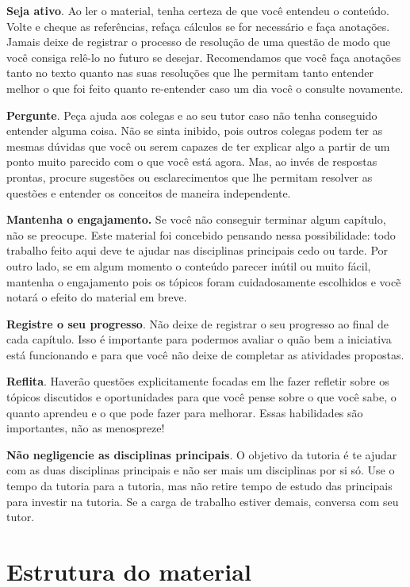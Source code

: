 \documentclass[10pt,openany]{book}
\begin{document}
\textbf{Seja ativo}. Ao ler o material, tenha certeza de que você entendeu o conteúdo. Volte e cheque as referências, refaça cálculos se for necessário e faça anotações. Jamais deixe de registrar o processo de resolução de uma questão de modo que você consiga relê-lo no futuro se desejar. Recomendamos que você faça anotações tanto no texto quanto nas suas resoluções que lhe permitam tanto entender  melhor o que foi feito quanto re-entender caso um dia você o consulte novamente. 
 
\textbf{Pergunte}. Peça ajuda aos colegas e ao seu tutor caso não tenha conseguido entender alguma coisa. Não se sinta inibido, pois outros colegas podem ter as mesmas dúvidas que você ou serem capazes de ter explicar algo a partir de um ponto muito parecido com o que você está agora. Mas, ao invés de respostas prontas, procure sugestões ou esclarecimentos que lhe permitam resolver as questões e entender os conceitos de maneira independente.

\textbf{Mantenha o engajamento.} Se você não conseguir terminar algum capítulo, não se preocupe. Este material foi concebido pensando nessa possibilidade: todo trabalho feito aqui deve te ajudar nas disciplinas principais cedo ou tarde. Por outro lado, se em algum momento o conteúdo parecer inútil ou muito fácil, mantenha o engajamento pois os tópicos foram cuidadosamente escolhidos e vocẽ notará o efeito do material em breve.

\textbf{Registre o seu progresso}. Não deixe de registrar o seu progresso ao final de cada capítulo. Isso é importante para podermos avaliar o quão bem a iniciativa está funcionando e para que você não deixe de completar as atividades propostas.

\textbf{Reflita}. Haverão questões explicitamente focadas em lhe fazer refletir sobre os tópicos discutidos e oportunidades para que você pense sobre o que você sabe, o quanto aprendeu e o que pode fazer para melhorar. Essas habilidades são importantes, não as menospreze! 

\textbf{Não negligencie as disciplinas principais}. O objetivo da tutoria é te ajudar com as duas disciplinas principais e não ser mais um disciplinas por si só. Use o tempo da tutoria para a tutoria, mas não retire tempo de estudo das principais para investir na tutoria. Se a carga de trabalho estiver demais, conversa com seu tutor.

\section{Estrutura do material}
\end{document}
